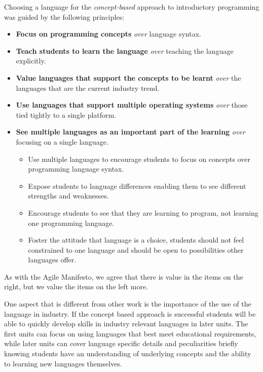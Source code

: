 %
% 
% 
% 


Choosing a language for the \emph{concept-based} approach to introductory programming was guided by the following principles:
\begin{itemize}[nolistsep,noitemsep]
	\item \textbf{Focus on programming concepts} \emph{over} language syntax.
	\item \textbf{Teach students to learn the language} \emph{over} teaching the language explicitly.
	\item \textbf{Value languages that support the concepts to be learnt} \emph{over} the languages that are the current industry trend.
	\item \textbf{Use languages that support multiple operating systems} \emph{over} those tied tightly to a single platform. 
	\item \textbf{See multiple languages as an important part of the learning} \emph{over} focusing on a single language.
	\begin{itemize}
		\item Use multiple languages to encourage students to focus on concepts over programming language syntax.
		\item Expose students to language differences enabling them to see different strengths and weaknesses. 
		\item Encourage students to see that they are learning to program, not learning one programming language.
		\item Foster the attitude that language is a choice, students should not feel constrained to one language and should be open to possibilities other languages offer.
	\end{itemize}
\end{itemize}

As with the Agile Manifesto, we agree that there is value in the items on the right, but we value the items on the left more.

One aspect that is different from other work is the importance of the use of the language in industry. If the concept based approach is successful students will be able to quickly develop skills in industry relevant languages in later units. The first units can focus on using languages that best meet educational requirements, while later units can cover language specific details and peculiarities briefly knowing students have an understanding of underlying concepts and the ability to learning new languages themselves. 

